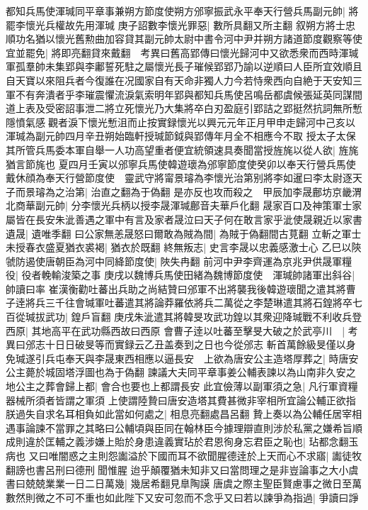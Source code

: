 都知兵馬使渾瑊同平章事兼朔方節度使朔方邠寧振武永平奉天行營兵馬副元帥|{
	將罷李懷光兵權故先用渾瑊}
庚子詔數李懷光罪惡|{
	數所具翻又所主翻}
叙朔方將士忠順功名猶以懷光舊勲曲加容貸其副元帥太尉中書令河中尹并朔方諸道節度觀察等使宜並罷免|{
	將即亮翻貸來戴翻　考異曰舊高郢傳曰懷光歸河中又欲悉衆而西時渾瑊軍孤羣帥未集郢與李鄘誓死駐之屬懷光長子璀候郢郢乃諭以逆順曰人臣所宜效順且自天寶以來阻兵者今復誰在况國家自有天命非獨人力今若恃衆西向自絶于天安知三軍不有奔潰者乎李璀震懼流淚氣索明年郢與都知兵馬使呂鳴岳都虞候張延英同謀間道上表及受密詔事泄二將立死懷光乃大集將卒白刃盈庭引郢詰之郢挺然抗詞無所慙隱憤氣感觀者淚下懷光慙沮而止按實録懷光以興元元年正月甲申走歸河中己亥以渾瑊為副元帥四月辛丑朔始臨軒授瑊節鉞與郢傳年月全不相應今不取}
授太子太保其所管兵馬委本軍自舉一人功高望重者便宜統領速具奏聞當授旌旄以從人欲|{
	旌旄猶言節旄也}
夏四月壬寅以邠寧兵馬使韓遊瓌為邠寧節度使癸卯以奉天行營兵馬使戴休顔為奉天行營節度使　靈武守將甯景璿為李懷光治第别將李如暹曰李太尉逐天子而景璿為之治第|{
	治直之翻為于偽翻}
是亦反也攻而殺之　甲辰加李晟鄜坊京畿渭北商華副元帥|{
	分李懷光兵柄以授李晟渾瑊鄜音夫華戶化翻}
晟家百口及神策軍士家屬皆在長安朱泚善遇之軍中有言及家者晟泣曰天子何在敢言家乎泚使晟親近以家書遺晟|{
	遺唯季翻}
曰公家無恙晟怒曰爾敢為賊為間|{
	為賊于偽翻間古莧翻}
立斬之軍士未授春衣盛夏猶衣裘褐|{
	猶衣於既翻}
終無叛志|{
	史言李晟以忠義感激士心}
乙巳以陝虢防遏使唐朝臣為河中同絳節度使|{
	陜失冉翻}
前河中尹李齊運為京兆尹供晟軍糧役|{
	役者輓輸浚築之事}
庚戌以魏博兵馬使田緒為魏博節度使　渾瑊帥諸軍出斜谷|{
	帥讀曰率}
崔漢衡勸吐蕃出兵助之尚結贊曰邠軍不出將襲我後韓遊瓌聞之遣其將曹子逹將兵三千往會瑊軍吐蕃遣其將論莽羅依將兵二萬從之李楚琳遣其將石鍠將卒七百從瑊拔武功|{
	鍠戶盲翻}
庚戌朱泚遣其將韓旻攻武功鍠以其衆迎降瑊戰不利收兵登西原|{
	其地高平在武功縣西故曰西原}
會曹子逹以吐蕃至擊旻大破之於武亭川　|{
	考異曰邠志十日日破旻等而實録云乙丑盖奏到之日也今從邠志}
斬首萬餘級旻僅以身免瑊遂引兵屯奉天與李晟東西相應以逼長安　上欲為唐安公主造塔厚葬之|{
	時唐安公主薨於城固塔浮圖也為于偽翻}
諫議大夫同平章事姜公輔表諫以為山南非久安之地公主之葬會歸上都|{
	會合也要也上都謂長安}
此宜儉薄以副軍須之急|{
	凡行軍資糧器械所須者皆謂之軍須}
上使謂陸贄曰唐安造塔其費甚微非宰相所宜論公輔正欲指朕過失自求名耳相負如此當如何處之|{
	相息亮翻處昌呂翻}
贄上奏以為公輔任居宰相遇事論諫不當罪之其略曰公輔頃與臣同在翰林臣今據理辯直則涉於私黨之嫌希旨順成則違於匡輔之義涉嫌上貽於身患違義實玷於君恩徇身忘君臣之恥也|{
	玷都念翻玉病也}
又曰唯闇惑之主則怨讟溢於下國而耳不欲聞腥德逹於上天而心不求寤|{
	讟徒牧翻謗也書呂刑曰德刑聞惟腥}
迨乎顛覆猶未知非又曰當問理之是非豈論事之大小虞書曰兢兢業業一日二日萬幾|{
	幾居希翻見臯陶謨}
唐虞之際主聖臣賢慮事之微日至萬數然則微之不可不重也如此陛下又安可忽而不念乎又曰若以諫爭為指過|{
	爭讀曰諍}
